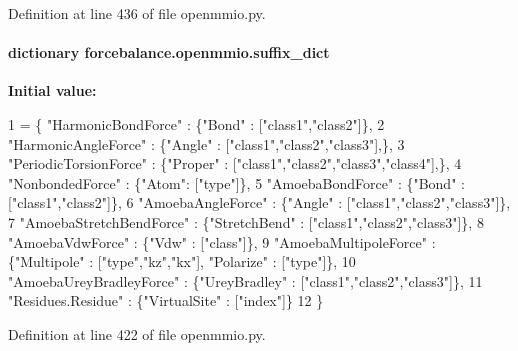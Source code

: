 Definition at line 436 of file openmmio.\-py.

\hypertarget{namespaceforcebalance_1_1openmmio_aeca37c08912f1a88339680ed75839530}{
\paragraph[{suffix\-\_\-dict}]{\setlength{\rightskip}{0pt plus 5cm}dictionary forcebalance.\-openmmio.\-suffix\-\_\-dict}}\label{namespaceforcebalance_1_1openmmio_aeca37c08912f1a88339680ed75839530}
{\bfseries Initial value\-:}
\begin{DoxyCode}
1 = \{ \textcolor{stringliteral}{"HarmonicBondForce"} : \{\textcolor{stringliteral}{"Bond"} : [\textcolor{stringliteral}{"class1"},\textcolor{stringliteral}{"class2"}]\},
2                 \textcolor{stringliteral}{"HarmonicAngleForce"} : \{\textcolor{stringliteral}{"Angle"} : [\textcolor{stringliteral}{"class1"},\textcolor{stringliteral}{"class2"},\textcolor{stringliteral}{"class3"}],\},
3                 \textcolor{stringliteral}{"PeriodicTorsionForce"} : \{\textcolor{stringliteral}{"Proper"} : [\textcolor{stringliteral}{"class1"},\textcolor{stringliteral}{"class2"},\textcolor{stringliteral}{"class3"},\textcolor{stringliteral}{"class4"}],\},
4                 \textcolor{stringliteral}{"NonbondedForce"} : \{\textcolor{stringliteral}{"Atom"}: [\textcolor{stringliteral}{"type"}]\},
5                 \textcolor{stringliteral}{"AmoebaBondForce"} : \{\textcolor{stringliteral}{"Bond"} : [\textcolor{stringliteral}{"class1"},\textcolor{stringliteral}{"class2"}]\},
6                 \textcolor{stringliteral}{"AmoebaAngleForce"} : \{\textcolor{stringliteral}{"Angle"} : [\textcolor{stringliteral}{"class1"},\textcolor{stringliteral}{"class2"},\textcolor{stringliteral}{"class3"}]\},
7                 \textcolor{stringliteral}{"AmoebaStretchBendForce"} : \{\textcolor{stringliteral}{"StretchBend"} : [\textcolor{stringliteral}{"class1"},\textcolor{stringliteral}{"class2"},\textcolor{stringliteral}{"class3"}]\},
8                 \textcolor{stringliteral}{"AmoebaVdwForce"} : \{\textcolor{stringliteral}{"Vdw"} : [\textcolor{stringliteral}{"class"}]\},
9                 \textcolor{stringliteral}{"AmoebaMultipoleForce"} : \{\textcolor{stringliteral}{"Multipole"} : [\textcolor{stringliteral}{"type"},\textcolor{stringliteral}{"kz"},\textcolor{stringliteral}{"kx"}], \textcolor{stringliteral}{"Polarize"} : [\textcolor{stringliteral}{"type"}]\},
10                 \textcolor{stringliteral}{"AmoebaUreyBradleyForce"} : \{\textcolor{stringliteral}{"UreyBradley"} : [\textcolor{stringliteral}{"class1"},\textcolor{stringliteral}{"class2"},\textcolor{stringliteral}{"class3"}]\},
11                 \textcolor{stringliteral}{"Residues.Residue"} : \{\textcolor{stringliteral}{"VirtualSite"} : [\textcolor{stringliteral}{"index"}]\}
12                 \}
\end{DoxyCode}


Definition at line 422 of file openmmio.\-py.

